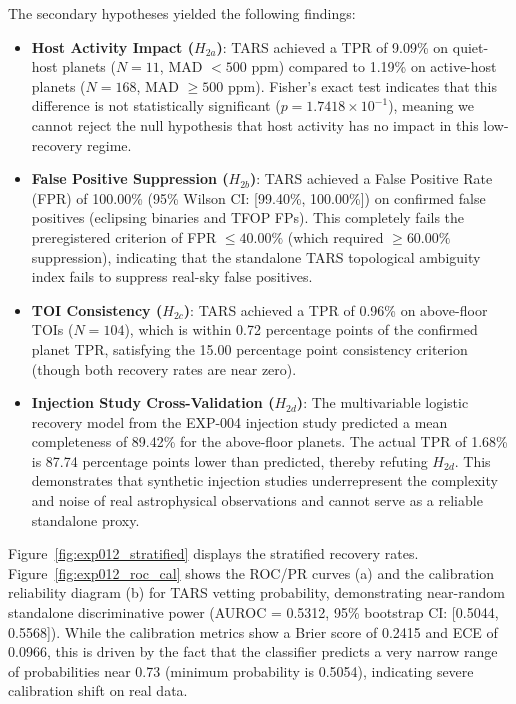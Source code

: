 The secondary hypotheses yielded the following findings:
\begin{itemize}
\item \textbf{Host Activity Impact ($H_{2a}$)}: TARS achieved a TPR of 9.09\% on quiet-host planets ($N = 11$, MAD $< 500$ ppm) compared to 1.19\% on active-host planets ($N = 168$, MAD $\ge 500$ ppm). Fisher's exact test indicates that this difference is not statistically significant ($p = 1.7418 \times 10^{-1}$), meaning we cannot reject the null hypothesis that host activity has no impact in this low-recovery regime.
\item \textbf{False Positive Suppression ($H_{2b}$)}: TARS achieved a False Positive Rate (FPR) of 100.00\% (95\% Wilson CI: [99.40\%, 100.00\%]) on confirmed false positives (eclipsing binaries and TFOP FPs). This completely fails the preregistered criterion of FPR $\le 40.00\%$ (which required $\ge 60.00\%$ suppression), indicating that the standalone TARS topological ambiguity index fails to suppress real-sky false positives.
\item \textbf{TOI Consistency ($H_{2c}$)}: TARS achieved a TPR of 0.96\% on above-floor TOIs ($N = 104$), which is within 0.72 percentage points of the confirmed planet TPR, satisfying the 15.00 percentage point consistency criterion (though both recovery rates are near zero).
\item \textbf{Injection Study Cross-Validation ($H_{2d}$)}: The multivariable logistic recovery model from the EXP-004 injection study predicted a mean completeness of 89.42\% for the above-floor planets. The actual TPR of 1.68\% is 87.74 percentage points lower than predicted, thereby refuting $H_{2d}$. This demonstrates that synthetic injection studies underrepresent the complexity and noise of real astrophysical observations and cannot serve as a reliable standalone proxy.
\end{itemize}

Figure~\ref{fig:exp012_stratified} displays the stratified recovery rates. Figure~\ref{fig:exp012_roc_cal} shows the ROC/PR curves (a) and the calibration reliability diagram (b) for TARS vetting probability, demonstrating near-random standalone discriminative power (AUROC = 0.5312, 95\% bootstrap CI: [0.5044, 0.5568]). While the calibration metrics show a Brier score of 0.2415 and ECE of 0.0966, this is driven by the fact that the classifier predicts a very narrow range of probabilities near 0.73 (minimum probability is 0.5054), indicating severe calibration shift on real data.

